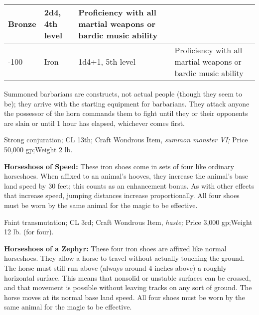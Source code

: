 \begin{longtable}{llllllll}
{\begin{minipage}[t]{0.044in}
Bronze\end{minipage}} & \multicolumn{1}{p{0.044in}|}{\begin{minipage}[t]{0.044in}\raggedright
2d4, 4th level\end{minipage}} & \multicolumn{1}{p{0.044in}|}{\begin{minipage}[t]{0.044in}\raggedright
Proficiency with all martial weapons or bardic music ability\end{minipage}}\\
\hline
\multicolumn{1}{|p{0.404in}|}{\begin{minipage}[t]{0.404in}\centering
91-100\end{minipage}} & \multicolumn{1}{p{0.649in}|}{\begin{minipage}[t]{0.649in}\centering
Iron\end{minipage}} & \multicolumn{1}{p{1.014in}|}{\begin{minipage}[t]{1.014in}\raggedright
1d4+1, 5th level\end{minipage}} & \multicolumn{5}{p{2.432in}|}{\begin{minipage}[t]{2.432in}\raggedright
Proficiency with all martial weapons or bardic music ability\end{minipage}}\\
\hline
\end{longtable}

Summoned barbarians are constructs, not actual people (though they seem to be); 
they arrive with the starting equipment for barbarians. They attack anyone the 
possessor of the horn commands them to fight until they or their opponents are 
slain or until 1 hour has elapsed, whichever comes first.

Strong conjuration; CL 13th; Craft Wondrous Item, \textit{summon monster VI; }Price 
50,000 gp;Weight 2 lb.

\textbf{Horseshoes of Speed:} These iron shoes come in sets of four like ordinary 
horseshoes. When affixed to an animal's hooves, they increase the animal's base 
land speed by 30 feet; this counts as an enhancement bonus. As with other effects 
that increase speed, jumping distances increase proportionally. All four shoes 
must be worn by the same animal for the magic to be effective.

Faint transmutation; CL 3rd; Craft Wondrous Item, \textit{haste; }Price 3,000 gp;Weight 
12 lb. (for four).

\textbf{Horseshoes of a Zephyr:} These four iron shoes are affixed like normal 
horseshoes. They allow a horse to travel without actually touching the ground. 
The horse must still run above (always around 4 inches above) a roughly horizontal 
surface. This means that nonsolid or unstable surfaces can be crossed, and that 
movement is possible without leaving tracks on any sort of ground. The horse moves 
at its normal base land speed. All four shoes must be worn by the same animal for 
the magic to be effective.

